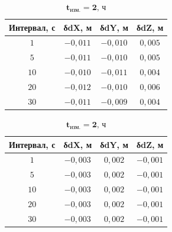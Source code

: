 \begin{table} [htbp]
	\centering\small
	\label{tab:tab23}{
			\hfill
			\begin{subtable}{.47\linewidth}	
				\centering
				\caption{$\mathbf{t_\text{изм.}=1\text{, ч}}$}
				\begin{tabular}{|c|c|c|c|}
					\hline
					\textbf{Интервал, с}	& \textbf{δdX, м}	& \textbf{δdY, м}	& \textbf{δdZ, м}	\\ \hline
					$ 1$					& $-0,011$			& $-0,010$			& $ 0,005$			\\ \hline
					$ 5$					& $-0,011$			& $-0,010$			& $ 0,005$			\\ \hline
					$10$					& $-0,010$			& $-0,011$			& $ 0,004$			\\ \hline
					$20$					& $-0,012$			& $-0,010$			& $ 0,006$			\\ \hline
					$30$					& $-0,011$			& $-0,009$			& $ 0,004$			\\ \hline
				\end{tabular}
			\end{subtable}%
			\qquad
			\begin{subtable}{.47\linewidth}	
				\centering
				\caption{$\mathbf{t_\text{изм.}=2\text{, ч}}$}
				\begin{tabular}{|c|c|c|c|}
					\hline
					\textbf{Интервал, с}	& \textbf{δdX, м}	& \textbf{δdY, м}	& \textbf{δdZ, м}	\\ \hline
					$ 1$					& $-0,003$			& $ 0,002$			& $-0,001$			\\ \hline
					$ 5$					& $-0,003$			& $ 0,002$			& $-0,001$			\\ \hline
					$10$					& $-0,003$			& $ 0,002$			& $-0,001$			\\ \hline
					$20$					& $-0,003$			& $ 0,002$			& $-0,001$			\\ \hline
					$30$					& $-0,003$			& $ 0,002$			& $-0,001$			\\ \hline
				\end{tabular}
			\end{subtable}\hfill%
			
}
\end{table}
